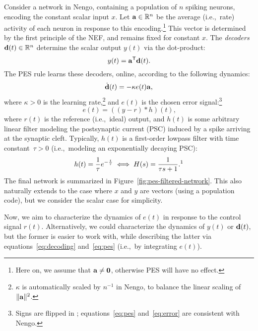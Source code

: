 Consider a network in Nengo, containing a population of $n$ spiking neurons, encoding the constant scalar input $x$.
Let $\mathbf{a} \in \mathbb{R}^n$ be the average (i.e.,~rate) activity of each neuron in response to this encoding.\footnote{Here on, we assume that $\mathbf{a} \ne \mathbf{0}$, otherwise PES will have no effect.}
This vector is determined by the first principle of the NEF, and remains fixed for constant $x$.
The \emph{decoders} $\mathbf{d}(t) \in \mathbb{R}^n$ determine the scalar output $y(t)$ via the dot-product:
\begin{equation}
\label{eq:decoding}
y(t) = {\mathbf{a}}^\mathsf{T} \mathbf{d}(t)  \text{.}
\end{equation}
The PES rule learns these decoders, online, according to the following dynamics:
\begin{equation}
\label{eq:pes}
\dot{\mathbf{d}}(t) = -\kappa e(t) \mathbf{a} \text{,}
\end{equation}
where $\kappa > 0$ is the learning rate,\footnote{$\kappa$ is automatically scaled by $n^{-1}$ in Nengo, to balance the linear scaling of $\|\mathbf{a}\|^2$.} and $e(t)$ is the chosen error signal:\footnote{Signs are flipped in \citet{voelker2015}; equations~\ref{eq:pes} and~\ref{eq:error} are consistent with Nengo.}
\begin{equation}
\label{eq:error}
e(t) = \left((y - r) \ast h \right)(t) \text{,}
\end{equation}
where $r(t)$ is the reference (i.e.,~ideal) output, and $h(t)$ is some arbitrary linear filter modeling the postsynaptic current (PSC) induced by a spike arriving at the synaptic cleft.
Typically, $h(t)$ is a first-order lowpass filter with time constant~$\tau > 0$ (i.e.,~modeling an exponentially decaying PSC): %
\begin{equation}
\label{eq:lowpass}
h(t) = \frac{1}{\tau} e^{-\frac{t}{\tau}} \iff H(s) = \frac{1}{\tau s + 1} \text{.\footnotemark}
\end{equation}
%
The final network is summarized in Figure~\ref{fig:pes-filtered-network}.
This also naturally extends to the case where $x$ and $y$ are vectors (using a population code), but we consider the scalar case for simplicity. 

Now, we aim to characterize the dynamics of $e(t)$ in response to the control signal $r(t)$.
Alternatively, we could characterize the dynamics of $y(t)$ or $\mathbf{d}(t)$, but the former is easier to work with, while describing the latter via equations~\ref{eq:decoding} and~\ref{eq:pes} (i.e.,~by integrating $e(t)$).

